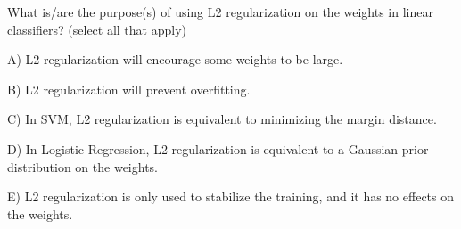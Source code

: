 What is/are the purpose(s) of using L2 regularization on the weights in linear classifiers? (select all that apply)


A) L2 regularization will encourage some weights to be large.


B) L2 regularization will prevent overfitting.


C) In SVM, L2 regularization is equivalent to minimizing the margin distance.


D) In Logistic Regression, L2 regularization is equivalent to a Gaussian prior distribution on the weights.


E) L2 regularization is only used to stabilize the training, and it has no effects on the weights.
